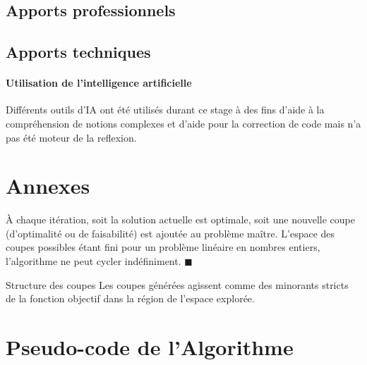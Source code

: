 \documentclass[12pt, a4paper, twoside]{report}
\numberwithin{equation}{section}
\begin{document}
	\subsection{Apports professionnels}
	
	
	\subsection{Apports techniques}
	
	
	
	\vfill{}
	\paragraph{Utilisation de l'intelligence artificielle} Différents outils d'IA ont été utilisés durant ce stage à des fins d'aide à la compréhension de notions complexes et d'aide pour la correction de code mais n'a pas été moteur de la reflexion. 
	
	
	
	\printbibliography
	
	\clearpage
	\section{Annexes}
	
	\clearpage
	\appendix
	
	
	\begin{preuve}
		À chaque itération, soit la solution actuelle est optimale, soit une nouvelle coupe (d'optimalité ou de faisabilité) est ajoutée au problème maître. L'espace des coupes possibles étant fini pour un problème linéaire en nombres entiers, l'algorithme ne peut cycler indéfiniment. \hfill $\blacksquare$
	\end{preuve}
	
	\begin{propriete}{Structure des coupes}{}
		Les coupes générées agissent comme des minorants stricts de la fonction objectif dans la région de l'espace explorée.
	\end{propriete}
	
	\section{Pseudo-code de l'Algorithme}
	
\end{document}
